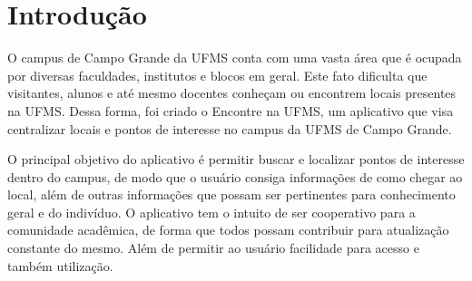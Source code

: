 \section{Introdução}
O campus de Campo Grande da UFMS conta com uma vasta área que é ocupada por diversas faculdades, institutos e blocos em geral. Este fato dificulta que visitantes, alunos e até mesmo docentes conheçam ou encontrem locais presentes na UFMS. Dessa forma, foi criado o Encontre na UFMS, um aplicativo que visa centralizar locais e pontos de interesse no campus da UFMS de Campo Grande.

O principal objetivo do aplicativo é permitir buscar e localizar pontos de interesse dentro do campus, de modo que o usuário consiga informações de como chegar ao local, além de outras informações que possam ser pertinentes para conhecimento geral e do indivíduo. O aplicativo tem o intuito de ser cooperativo para a comunidade acadêmica, de forma que todos possam contribuir para atualização constante do mesmo. Além de permitir ao usuário facilidade para acesso e também utilização.